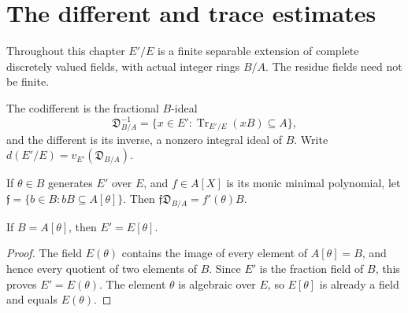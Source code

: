 \chapter{The different and trace estimates}

Throughout this chapter $E'/E$ is a finite separable extension of
complete discretely valued fields, with actual integer rings $B/A$.
The residue fields need not be finite.

\begin{definition}
\label{fw:different}
\mathlibok
The codifferent is the fractional $B$-ideal
\[
 \mathfrak D_{B/A}^{-1}
 =\{x\in E':\operatorname{Tr}_{E'/E}(xB)\subseteq A\},
\]
and the different is its inverse, a nonzero integral ideal of $B$.
Write $d(E'/E)=v_{E'}(\mathfrak D_{B/A})$.
\end{definition}

\begin{lemma}
\label{fw:conductor-different}
\mathlibok
If $\theta\in B$ generates $E'$ over $E$, and $f\in A[X]$ is its
monic minimal polynomial, let
$\mathfrak f=\{b\in B:bB\subseteq A[\theta]\}$. Then
$\mathfrak f\mathfrak D_{B/A}=f'(\theta)B$.
\end{lemma}

\begin{lemma}
\label{fw:integral-fraction-generator}
\leanok
If $B=A[\theta]$, then $E'=E[\theta]$.
\end{lemma}
\begin{proof}
The field $E(\theta)$ contains the image of every element of
$A[\theta]=B$, and hence every quotient of two elements of $B$.
Since $E'$ is the fraction field of $B$, this proves
$E'=E(\theta)$. The element $\theta$ is algebraic over $E$,
so $E[\theta]$ is already a field and equals $E(\theta)$.
\end{proof}

